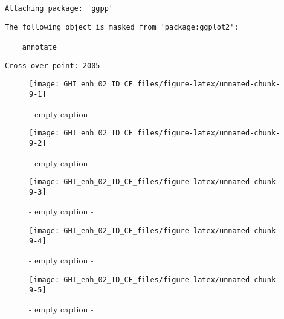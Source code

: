 \documentclass[
  10pt,
  a4paper,oneside]{article}
\begin{document}
\begin{verbatim}
Attaching package: 'ggpp'
\end{verbatim}

\begin{verbatim}
The following object is masked from 'package:ggplot2':

    annotate
\end{verbatim}

\begin{verbatim}
Cross over point: 2005 
\end{verbatim}

\begin{figure}[H]

{\centering \texttt{[image: GHI\_enh\_02\_ID\_CE\_files/figure-latex/unnamed-chunk-9-1]} 

}

\caption{ - empty caption - }\label{fig:unnamed-chunk-9-1}
\end{figure}
\begin{figure}[H]

{\centering \texttt{[image: GHI\_enh\_02\_ID\_CE\_files/figure-latex/unnamed-chunk-9-2]} 

}

\caption{ - empty caption - }\label{fig:unnamed-chunk-9-2}
\end{figure}
\begin{figure}[H]

{\centering \texttt{[image: GHI\_enh\_02\_ID\_CE\_files/figure-latex/unnamed-chunk-9-3]} 

}

\caption{ - empty caption - }\label{fig:unnamed-chunk-9-3}
\end{figure}
\begin{figure}[H]

{\centering \texttt{[image: GHI\_enh\_02\_ID\_CE\_files/figure-latex/unnamed-chunk-9-4]} 

}

\caption{ - empty caption - }\label{fig:unnamed-chunk-9-4}
\end{figure}
\begin{figure}[H]

{\centering \texttt{[image: GHI\_enh\_02\_ID\_CE\_files/figure-latex/unnamed-chunk-9-5]} 

}

\caption{ - empty caption - }\label{fig:unnamed-chunk-9-5}
\end{figure}
\end{document}
